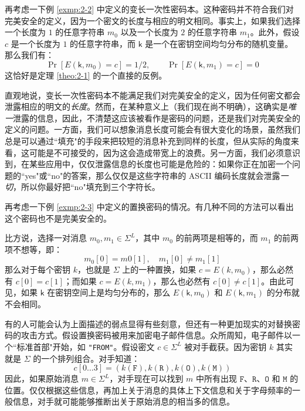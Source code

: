 \begin{example}\label{exmp:2-5}
再考虑一下例 \ref{exmp:2-2} 中定义的变长一次性密码本。这种密码并不符合我们对完美安全的定义，因为一个密文的长度与相应的明文相同。事实上，如果我们选择一个长度为 $1$ 的任意字符串 $m_0$ 以及一个长度为 $2$ 的任意字符串 $m_1$。此外，假设 $c$ 是一个长度为 $1$ 的任意字符串，而 $\mathsf{k}$ 是一个在密钥空间均匀分布的随机变量。那么我们有：
\[
\Pr[E(\mathsf{k},m_0)=c]={1}/{2},
\quad\quad
\Pr[E(\mathsf{k},m_1)=c]=0
\]
这恰好是定理 \ref{theo:2-1} 的一个直接的反例。

直观地说，变长一次性密码本不能满足我们对完美安全的定义，因为任何密文都会泄露相应的明文的\emph{长度}。然而，在某种意义上（我们现在尚不明确），这确实是\emph{唯一}泄露的信息，因此，不清楚这应该被看作是密码的问题，还是我们对完美安全的定义的问题。一方面，我们可以想象消息长度可能会有很大变化的场景，虽然我们总是可以通过``填充"的手段来把较短的消息补充到同样的长度，但从实际的角度来看，这可能是不可接受的，因为这会造成带宽上的浪费。另一方面，我们必须意识到，在某些应用中，仅仅泄露信息的长度也可能是危险的：如果你正在加密一个问题的``yes"或``no"的答案，那么仅仅是这些字符串的 ASCII 编码长度就会泄露\emph{一切}，所以你最好把``no"填充到三个字符长。

\end{example}

\begin{example}\label{exmp:2-6}
再考虑一下例 \ref{exmp:2-3} 中定义的置换密码的情况。有几种不同的方法可以看出这个密码也不是完美安全的。

比方说，选择一对消息 $m_0,m_1\in\Sigma^L$，其中 $m_0$ 的前两项是相等的，而 $m_1$ 的前两项不想等，即：
\[
m_0[0]=m0[1],
\quad
m_1[0]\neq m_1[1]
\]
那么对于每个密钥 $k$，也就是 $\Sigma$ 上的一种置换，如果 $c = E(k,m_0)$，那么必然有 $c[0] = c[1]$；而如果 $c = E(k,m_1)$，那么也必然有 $c[0]\neq c[1]$。由此可见，如果 $\mathsf{k}$ 在密钥空间上是均匀分布的，那么 $E(\mathsf{k},m_0)$ 和 $E(\mathsf{k},m_1)$ 的分布就不会相同。

有的人可能会认为上面描述的弱点显得有些刻意，但还有一种更加现实的对替换密码的攻击方式。假设置换密码被用来加密电子邮件信息。众所周知，电子邮件以一个``标准首部"开始，如 \texttt{"FROM"}。假设密文 $c\in\Sigma^L$ 被对手截获。因为密钥 $k$ 其实就是 $\Sigma$ 的一个排列组合。对手知道：
\[
c[0\dots3]=(k(\mathtt F),k(\mathtt R),k(\mathtt O),k(\mathtt M))
\]
因此，如果原始消息 $m\in\Sigma^L$，对手现在可以找到 $m$ 中所有出现 $\mathtt F$、$\mathtt R$、$\mathtt O$ 和 $\mathtt M$ 的位置。仅仅根据这些信息，再加上关于消息的具体上下文信息和关于字母频率的一般信息，对手就可能能够推断出关于原始消息的相当多的信息。
\end{example}

